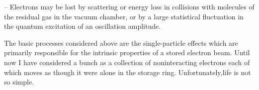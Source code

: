 -- Electrons may be lost by scattering or energy loss in collisions with molecules of the residual gas in the vacuum chamber, or by a large statistical fluctuation in the quantum excitation of an oscillation amplitude.

The basic processes considered above are the single-particle effects which are primarily responsible for the intrinsic properties of a stored electron beam. Until now I have considered a bunch as a collection of noninteracting electrons each of which moves as though it were alone in the storage ring. Unfortunately,life is not so simple.